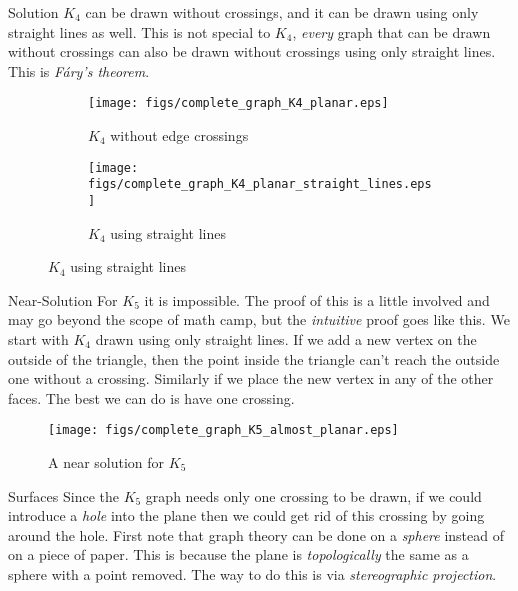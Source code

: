 \documentclass{beamer}
\begin{document}
    \begin{frame}{Solution}
        $K_{4}$ can be drawn without crossings, and it can be drawn
        using only straight lines as well. This is not special to $K_{4}$,
        \textit{every} graph that can be drawn without crossings can also be
        drawn without crossings using only straight lines. This is
        \textit{F\'{a}ry's theorem}.
        \begin{figure}
            \centering
            \begin{subfigure}[b]{0.49\textwidth}
            \centering
                \texttt{[image: figs/complete\_graph\_K4\_planar.eps]}
                \caption{$K_{4}$ without edge crossings}
                \label{fig:K_4_planar}
            \end{subfigure}
            \begin{subfigure}[b]{0.49\textwidth}
                \centering
                \texttt{[image: figs/complete\_graph\_K4\_planar\_straight\_lines.eps]}
                \caption{$K_{4}$ using straight lines}
                \label{fig:K_4_planar_straight}
            \end{subfigure}
        \end{figure}
    \end{frame}
    \begin{frame}{Near-Solution}
        For $K_{5}$ it is impossible. The proof of this is a little involved and
        may go beyond the scope of math camp, but the
        \textit{intuitive} proof goes like this. We start
        with $K_{4}$ drawn using only straight lines. If we add a new vertex on the outside of
        the triangle, then the point inside the triangle can't reach the outside one without a
        crossing. Similarly if we place the new vertex in any of the other faces.
        The best we can do is have one crossing.
        \begin{figure}
            \centering
            \texttt{[image: figs/complete\_graph\_K5\_almost\_planar.eps]}
            \caption{A near solution for $K_{5}$}
            \label{fig:K_5_almost_planar}
        \end{figure}
    \end{frame}
    \begin{frame}{Surfaces}
        Since the $K_{5}$ graph needs only one crossing to be drawn, if we could introduce a
        \textit{hole} into the plane then we could get rid of this crossing by going around the
        hole. First note that graph theory can be done on a \textit{sphere} instead of on a
        piece of paper. This is because the plane is \textit{topologically} the same as
        a sphere with a point removed. The way to do this is via
        \textit{stereographic projection}.
    \end{frame}
\end{document}
